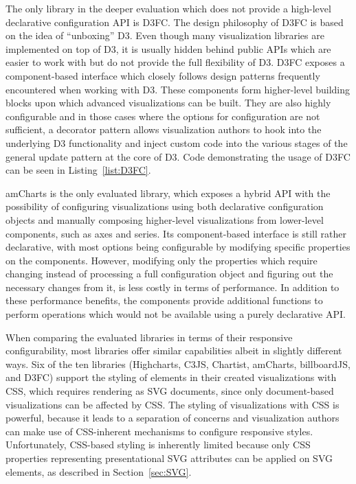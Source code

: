 The only library in the deeper evaluation which does not provide a
high-level declarative configuration API is D3FC. The design
philosophy of D3FC is based on the idea of \enquote{unboxing} D3. Even
though many visualization libraries are implemented on top of D3, it
is usually hidden behind public APIs which are easier to work with but
do not provide the full flexibility of D3. D3FC exposes a
component-based interface which closely follows design patterns
frequently encountered when working with D3. These components form
higher-level building blocks upon which advanced visualizations can be
built. They are also highly configurable and in those cases where the
options for configuration are not sufficient, a decorator pattern
allows visualization authors to hook into the underlying D3
functionality and inject custom code into the various stages of the
general update pattern at the core of D3. Code demonstrating the usage
of D3FC can be seen in Listing~\ref{list:D3FC}.


\begin{samepage}
%
A basic bar chart defined using D3FC's component-based API.
},
]{listings/d3fc.js}
\end{samepage}



amCharts is the only evaluated library, which exposes a hybrid API
with the possibility of configuring visualizations using both
declarative configuration objects and manually composing higher-level
visualizations from lower-level components, such as axes and series.
Its component-based interface is still rather declarative, with most
options being configurable by modifying specific properties on the
components. However, modifying only the properties which require
changing instead of processing a full configuration object and
figuring out the necessary changes from it, is less costly in terms of
performance. In addition to these performance benefits, the components
provide additional functions to perform operations which would not be
available using a purely declarative API.




When comparing the evaluated libraries in terms of their responsive
configurability, most libraries offer similar capabilities albeit in
slightly different ways. Six of the ten libraries (Highcharts, C3JS,
Chartist, amCharts, billboardJS, and D3FC) support the styling of
elements in their created visualizations with CSS, which requires
rendering as SVG documents, since only document-based visualizations
can be affected by CSS. The styling of visualizations with CSS is
powerful, because it leads to a separation of concerns and
visualization authors can make use of CSS-inherent mechanisms to
configure responsive styles. Unfortunately, CSS-based styling is
inherently limited because only CSS properties representing
presentational SVG attributes can be applied on SVG elements, as
described in Section~\ref{sec:SVG}.

